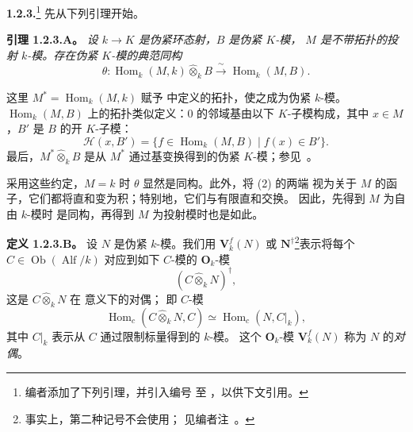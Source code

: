 
\medskip
\noindent\textbf{1.2.3.}\footnote{\label{sga3:VIIB:nde:45}编者添加了下列引理，并引入编号  至
，以供下文引用。}
\label{sga3:VIIB:1.2.3}
先从下列引理开始。

\medskip
\noindent\textbf{引理 1.2.3.A。}
\label{sga3:VIIB:1.2.3.A}
{\itshape 设 \(k\longrightarrow K\) 是伪紧环态射，\(B\) 是伪紧 \(K\)-模，
\(M\) 是不带拓扑的投射 \(k\)-模。存在伪紧 \(K\)-模的典范同构
\begin{equation}
  \theta:
  \operatorname{Hom}_k(M,k)\widehat{\otimes}_k B
  \xrightarrow{\ \sim\ }
  \operatorname{Hom}_k(M,B).
  \tag{2}
  \label{sga3:VIIB:1.2.3:eq2}
\end{equation}}

这里 \(M^*=\operatorname{Hom}_k(M,k)\) 赋予
 中定义的拓扑，使之成为伪紧 \(k\)-模。
\(\operatorname{Hom}_k(M,B)\) 上的拓扑类似定义：\(0\) 的邻域基由以下
\(K\)-子模构成，其中 \(x\in M\)，\(B'\) 是 \(B\) 的开 \(K\)-子模：
\[
  \mathscr H(x,B')
  =
  \{f\in\operatorname{Hom}_k(M,B)\mid f(x)\in B'\}.
\]
最后，\(M^*\widehat{\otimes}_kB\) 是从 \(M^*\) 通过基变换得到的伪紧
\(K\)-模；参见\ 。

采用这些约定，\(M=k\) 时 \(\theta\) 显然是同构。此外，将 \textup{(2)} 的两端
视为关于 \(M\) 的函子，它们都将直和变为积；特别地，它们与有限直和交换。
因此，先得到 \(M\) 为自由 \(k\)-模时 \textup{}
是同构，再得到 \(M\) 为投射模时也是如此。

\medskip
\noindent\textbf{定义 1.2.3.B。}
\label{sga3:VIIB:1.2.3.B}
设 \(N\) 是伪紧 \(k\)-模。我们用 \(\mathbf V_k^f(N)\) 或
\(\mathbf N^\dagger\)\footnote{\label{sga3:VIIB:nde:46}事实上，第二种记号不会使用；
见编者注~。}表示将每个
\(C\in\operatorname{Ob}(\operatorname{Alf}/k)\) 对应到如下 \(C\)-模的 \(\mathbf O_k\)-模
\[
  (C\widehat{\otimes}_kN)^\dagger,
\]
这是 \(C\widehat{\otimes}_kN\) 在  意义下的对偶；
即 \(C\)-模
\[
  \operatorname{Hom}_c(C\widehat{\otimes}_kN,C)
  \simeq
  \operatorname{Hom}_c(N,C|_k),
\]
其中 \(C|_k\) 表示从 \(C\) 通过限制标量得到的 \(k\)-模。
这个 \(\mathbf O_k\)-模 \(\mathbf V_k^f(N)\) 称为 \(N\) 的\emph{对偶}。

